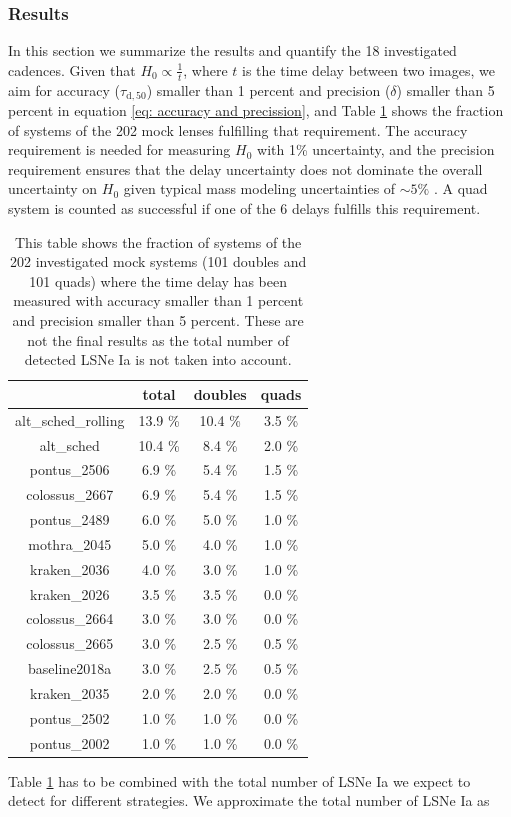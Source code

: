 \subsubsection{Results}
\label{sec:results}
In this section we summarize the results and quantify the 18
investigated cadences. Given that $H_0 \propto \frac{1}{t}$, where $t$
is the time delay between two images, we aim for accuracy
($\tau_\mathrm{d,50}$) smaller than 1 percent and precision ($\delta$)
smaller than 5 percent in equation \ref{eq: accuracy and precission},
and Table \ref{tab: fraction of systems} shows the fraction of systems
of the 202 mock lenses fulfilling that requirement. The accuracy
requirement is needed for measuring $H_0$ with 1\% uncertainty, and
the precision requirement ensures that the delay uncertainty does not
dominate the overall uncertainty on $H_0$ given typical mass modeling
uncertainties of $\sim 5\%$ \citep[e.g.,][]{Suyu2018}.  A quad system is counted as successful if one of the 6 delays fulfills this requirement.\\
%
\begin{table}
\centering
\begin{tabular}{c|c|c|c}
&total& doubles & quads \\
\hline
alt\_sched\_rolling & 13.9 \% & 10.4 \% &3.5 \% \\
\hline
alt\_sched & 10.4 \% & 8.4 \% & 2.0 \% \\
\hline
pontus\_2506 & 6.9 \% & 5.4 \% &1.5 \% \\
\hline
colossus\_2667 & 6.9 \% & 5.4 \% &1.5 \% \\
\hline
pontus\_2489 & 6.0 \% & 5.0 \% &1.0 \% \\
\hline
mothra\_2045 & 5.0 \% & 4.0 \% &1.0 \% \\
\hline
kraken\_2036 & 4.0 \% & 3.0 \% &1.0 \% \\
\hline
kraken\_2026 & 3.5 \% & 3.5 \% &0.0 \% \\
\hline
colossus\_2664 & 3.0 \% & 3.0 \% &0.0 \% \\
\hline
colossus\_2665 & 3.0 \% & 2.5 \% &0.5 \% \\
\hline
baseline2018a & 3.0 \% & 2.5 \% &0.5 \% \\
\hline
kraken\_2035 & 2.0 \% & 2.0 \% &0.0 \% \\
\hline
pontus\_2502 & 1.0 \% & 1.0 \% &0.0 \% \\
\hline
pontus\_2002 & 1.0 \% & 1.0 \% &0.0 \% \\
\end{tabular}
\caption{This table shows the fraction of systems of the 202 investigated mock systems (101 doubles and 101 quads) where the time delay has been measured with accuracy smaller than 1 percent and precision smaller than 5 percent. These are not the final results as the total number of detected LSNe Ia is not taken into account. }
\label{tab: fraction of systems}
\end{table}
Table \ref{tab: fraction of systems} has to be combined with the total number of LSNe Ia we expect to detect for different strategies. We approximate the total number of LSNe Ia as

